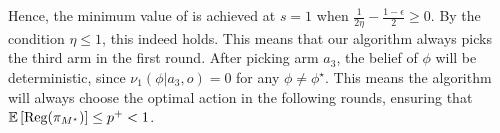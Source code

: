 Hence, the minimum value of  is achieved at $s=1$ when $\frac{1}{2\eta} - \frac{1-\epsilon}{2}\geq 0$.  By the condition $\eta\leq 1$, this indeed holds. This means that 
our algorithm always picks the third arm in the first round. After picking arm $a_3$, the belief of $\phi$ will be deterministic, since $\nu_1(\phi|a_3, o)=0$ for any $\phi\neq \phi^\star$. 
This means the algorithm will always choose the optimal action in the following rounds, ensuring that $\mathbb{E}\left[\text{\rm Reg}(\pi_{M^\star})\right] \leq p^+ < 1$.











